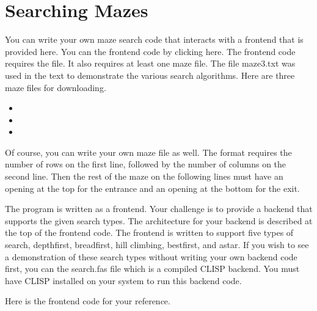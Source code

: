 \documentclass[letterpaper,10pt,english]{sphinxmanual}
\begin{document}
\section{Searching Mazes}
\label{\detokenize{chap12/chap12:searching-mazes}}
You can write your own maze search code that interacts with a front\sphinxhyphen{}end that is provided here. You can  the front\sphinxhyphen{}end code by clicking here. The front\sphinxhyphen{}end code requires the  file. It also requires at least one maze file. The file maze3.txt was used in the text to demonstrate the various search algorithms. Here are three maze files for downloading.
\begin{itemize}
\item {} 

\item {} 

\item {} 

\end{itemize}

Of course, you can write your own maze file as well. The format requires the number of rows on the first line, followed by the number of columns on the second line. Then the rest of the maze on the following lines must have an opening at the top for the entrance and an opening at the bottom for the exit.

The program is written as a front\sphinxhyphen{}end. Your challenge is to provide a back\sphinxhyphen{}end that supports the given search types. The architecture for your back\sphinxhyphen{}end is described at the top of the front\sphinxhyphen{}end code. The front\sphinxhyphen{}end is written to support five types of search, depth\sphinxhyphen{}first, bread\sphinxhyphen{}first, hill climbing, best\sphinxhyphen{}first, and a\sphinxhyphen{}star. If you wish to see a demonstration of these search types without writing your own back\sphinxhyphen{}end code first, you can  the search.fas file which is a compiled CLISP back\sphinxhyphen{}end. You must have CLISP installed on your system to run this back\sphinxhyphen{}end code.

Here is the front\sphinxhyphen{}end code for your reference.
\end{document}
